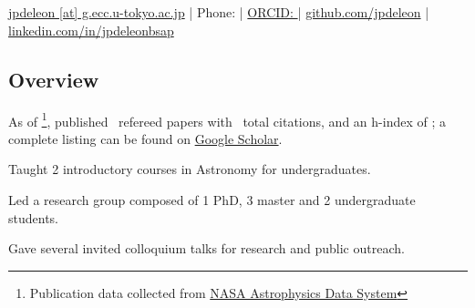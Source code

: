 \documentclass[11pt,letterpaper]{article}
\begin{document}
\thispagestyle{empty}\sloppy\sloppypar\raggedbottom

\textbf{\Large \fullname} \\[0.5ex]
\currentposition \\
\textsf{\small 
    \href{mailto:\email}{jpdeleon [at] g.ecc.u-tokyo.ac.jp} | %
    Phone: {\phonenumber} | %
    \href{\orcidurl}{ORCID: \orcid} | %
    \href{\githuburl}{github.com/jpdeleon} | %
    \href{\linkedinurl}{linkedin.com/in/jpdeleonbsap}
}\\[0.5ex]

\subsection{Overview}
\begin{list}{}{\cvlist}
    \item As of \pubsdate\footnote{Publication data collected from \href{https://ui.adsabs.harvard.edu/}{NASA Astrophysics Data System}}, published \pubsnumber\ refereed papers with \pubscitations\ total citations, and an h-index of \pubshindex; a complete listing can be found on \href{\scholarurl}{Google Scholar}.
    \item Taught 2 introductory courses in Astronomy for undergraduates. 
    \item Led a research group composed of 1 PhD, 3 master and 2 undergraduate students. 
    \item Gave several invited colloquium talks for research and public outreach.
\end{list}
\end{document}
